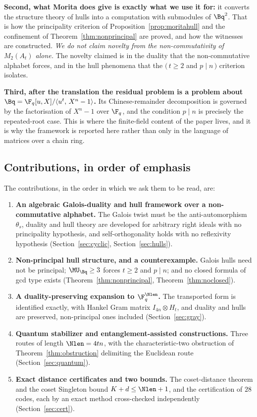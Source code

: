 \textbf{Second, what Morita does give is exactly what we use it for:} it
converts the structure theory of hulls into a computation with submodules of
$\Bq^2$. That is how the principality criterion of
Proposition~\ref{prop:moritahull} and the confinement of
Theorem~\ref{thm:nonprincipal} are proved, and how the witnesses are
constructed. \emph{We do not claim novelty from the non-commutativity of
$M_2(A_t)$ alone.} The novelty claimed is in the duality that the
non-commutative alphabet forces, and in the hull phenomena that the
$(\,t\ge2$ and $p\mid n\,)$ criterion isolates.

\textbf{Third, after the translation the residual problem is a problem about
$\Bq=\F_q[u,X]/\langle u^t,\,X^n-1\rangle$.} Its Chinese-remainder
decomposition is governed by the factorisation of $X^n-1$ over $\F_q$, and the
condition $p\mid n$ is precisely the repeated-root case. This is where the
finite-field content of the paper lives, and it is why the framework is
reported here rather than only in the language of matrices over a chain ring.

\subsection{Contributions, in order of emphasis}
\label{subsec:contributions}

The contributions, in the order in which we ask them to be read, are:

\begin{enumerate}
\item \textbf{An algebraic Galois-duality and hull framework over a
  non-commutative alphabet.} The Galois twist must be the anti-automorphism
  $\theta_s$, duality and hull theory are developed for arbitrary right ideals
  with no principality hypothesis, and self-orthogonality holds with no
  reflexivity hypothesis (Section~\ref{sec:cyclic}, Section~\ref{sec:hulls}).
\item \textbf{Non-principal hull structure, and a counterexample.} Galois
  hulls need not be principal; $\MU_{\Bq}\ge3$ forces $t\ge2$ and $p\mid n$;
  and no closed formula of gcd type exists
  (Theorem~\ref{thm:nonprincipal}, Theorem~\ref{thm:noclosed}).
\item \textbf{A duality-preserving expansion to $\F_q^{\Nlen}$.} The
  transported form is identified exactly, with Hankel Gram matrix
  $I_{4n}\otimes H_t$, and duality and hulls are preserved, non-principal ones
  included (Section~\ref{sec:gray}).
\item \textbf{Quantum stabilizer and entanglement-assisted constructions.}
  Three routes of length $\Nlen=4tn$, with the characteristic-two obstruction
  of Theorem~\ref{thm:obstruction} delimiting the Euclidean route
  (Section~\ref{sec:quantum}).
\item \textbf{Exact distance certificates and two bounds.} The coset-distance
  theorem and the coset Singleton bound $K+d\le\Nlen+1$, and the certification
  of $28$ codes, each by an exact method cross-checked independently
  (Section~\ref{sec:cert}).
\end{enumerate}

